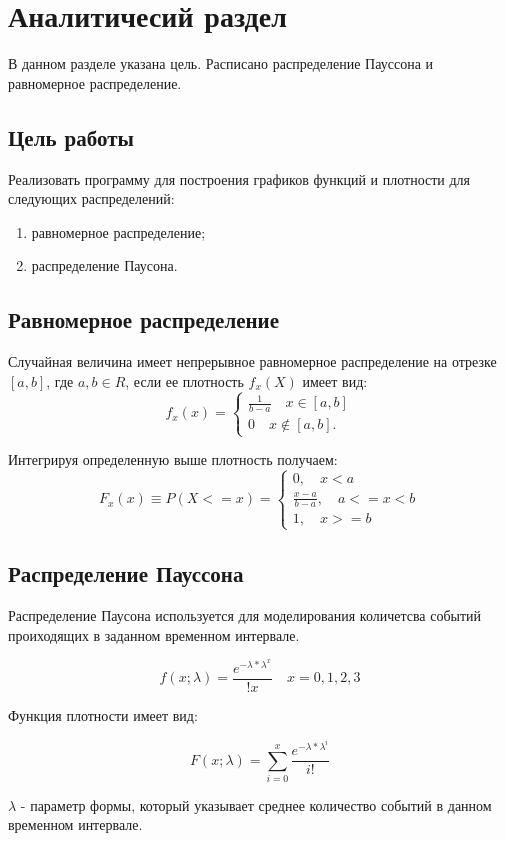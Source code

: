 \section{Аналитичесий раздел}
В данном разделе указана цель. 
Расписано распределение Пауссона и равномерное распределение.

\subsection{Цель работы}
Реализовать программу для построения графиков функций и плотности для следующих распределений:
\begin{enumerate}
	\item равномерное распределение;
	\item распределение Паусона.
\end{enumerate}

\subsection{Равномерное распределение}
Случайная величина имеет непрерывное равномерное распределение на отрезке $[a,b]$, где $a,b \in R $, если ее плотность $f_x(X)$ имеет вид:
\begin{equation}
f_x(x)=\begin{cases}
\frac{1}{b-a} \quad x \in [a,b] \\
0 \quad x \notin [a,b].
\end{cases}
\end{equation}

Интегрируя определенную выше плотность получаем:
\begin{equation}
F_x(x) \equiv P(X <= x) = \begin{cases}
	0, \quad x < a \\
	\frac{x - a}{b - a}, \quad a <= x < b \\
	1, \quad x >= b
\end{cases}
\end{equation}

\subsection{Распределение Пауссона}
Распределение Паусона используется для моделирования количетсва событий проиходящих в заданном временном интервале.


\begin{equation}
f(x; \lambda) = \frac{e^{-\lambda * \lambda^x}}{!x} \quad x = 0, 1, 2, 3
\end{equation}

Функция плотности имеет вид:

\begin{equation}
	F(x; \lambda) = \sum_{i=0}^{x}\frac{e^{-\lambda * \lambda^i}}{i!} 
\end{equation}

$\lambda$ - параметр формы, который указывает среднее количество событий в данном временном интервале.

